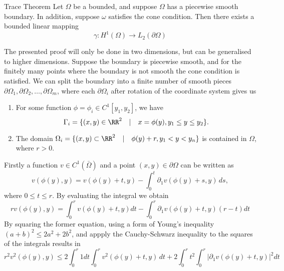
\begin{defn}{Trace Theorem}\label{defn:trace}
    Let $\Omega$ be a bounded, and suppose $\Omega$ has a piecewise smooth boundary. In addition, suppose $\omega$ satisfies the cone condition. Then there exists a bounded linear mapping
    \begin{equation*}
        \gamma : H^1(\Omega) \to L_2(\partial \Omega)
    \end{equation*}
\end{defn}
\begin{bev}
    The presented proof will only be done in two dimensions, but can be generalised to higher dimensions.
    Suppose the boundary is piecewise smooth, and for the finitely many points where the boundary is not smooth the cone condition is satisfied. We can split the boundary into a finite number of smooth pieces $\partial \Omega_1, \partial \Omega_2, \dots, \partial \Omega_m$, where each $\partial \Omega_i$ after rotation of the coordinate system gives us
    \begin{enumerate}
        \item For some function $\phi = \phi_i \in C^1[y_1, y_2]$, we have
            \[ \Gamma_i = \{ (x,y) \in \RR^2 \quad | \quad x = \phi(y), y_1 \leq y \leq y_2 \}. \]
        \item The domain $\Omega_i = \{ (x,y) \subset \RR^2 \quad | \quad \phi(y) + r, y_1 < y < y_n \}$ is contained in $\Omega$, where $r > 0$.
    \end{enumerate}
    Firstly a function $v \in C^1(\bar{\Omega})$ and a point $(x,y) \in \partial \Omega$ can be written as
    \begin{equation}
        v(\phi(y), y) = v(\phi(y) + t, y) - \int_0^t \partial_1 v(\phi(y) + s, y) \, ds,
    \end{equation}
    where $0 \leq t \leq r$. By evaluating the integral we obtain
    \begin{equation}
        r v(\phi(y), y) = \int_0^r v(\phi(y) + t, y) dt - \int_0^r \partial_1 v(\phi(y) + t, y)(r-t) dt
    \end{equation}
    By squaring the former equation, using a form of Young's inequality ${(a+b)}^2 \leq 2a^2 + 2b^2$, and appply the Cauchy-Schwarz inequality to the squares of the integrals results in
    \begin{equation}
        r^2 v^2(\phi(y), y) \leq 2 \int_0^r 1 dt \int_0^r v^2(\phi(y) + t, y) \, dt +  2\int_0^r t^2 \int_0^r | \partial_1  v(\phi(y) + t, y) |^2 dt

\end{equation}
\end{bev}
